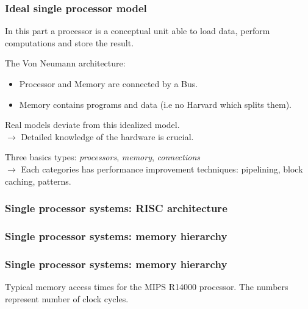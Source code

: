 \begin{frame}
  \frametitle{Ideal single processor model}

In this part a processor is a conceptual unit able to load data, perform computations and store the result.

\medskip
The Von Neumann architecture:
  \begin{center}
    \scalebox{0.8}{
      
    }
  \end{center}

\begin{itemize}
\item Processor and Memory are connected by a Bus.
\item Memory contains programs and data (i.e no Harvard which splits them).
\end{itemize}

\medskip
Real models deviate from this idealized model.\\[2ex]
$\rightarrow$ Detailed knowledge of the hardware is crucial.

\bigskip
Three basics types: \textit{processors}, \textit{memory}, \textit{connections}\\[2ex]
$\rightarrow$ Each categories has performance improvement techniques: pipelining, block caching, patterns.

\end{frame}

\begin{frame}
  \frametitle{Single processor systems: RISC architecture}
  \begin{center}
    \scalebox{0.8}{
      
    }
  \end{center}
\end{frame}

\begin{frame}
  \frametitle{Single processor systems: memory hierarchy}
  \begin{center}
    \scalebox{0.8}{
      
    }
  \end{center}
\end{frame}



\begin{frame}
  \frametitle{Single processor systems: memory hierarchy}

  Typical memory access times for the MIPS R14000 processor. The numbers
  represent number of clock cycles.
  \begin{center}
    
  \end{center}
\end{frame}

